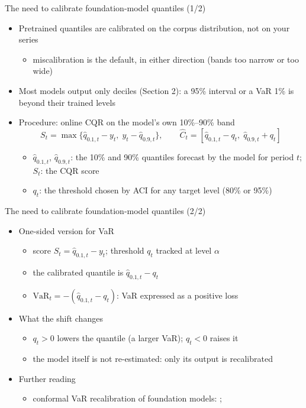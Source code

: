 \begin{frame}{The need to calibrate foundation-model quantiles (1/2)}
\itemsize{\small}
\begin{itemize}
    \item Pretrained quantiles are calibrated on the corpus distribution, not on your series
    \begin{itemize}
        \item miscalibration is the default, in either direction (bands too narrow or too wide)
    \end{itemize}
    \item Most models output only deciles (Section 2): a 95\% interval or a VaR 1\% is beyond their trained levels
    \item Procedure: online CQR on the model's own 10\%--90\% band \[ S_t = \max\{\hat q_{0.1,t} - y_t,\; y_t - \hat q_{0.9,t}\}, \qquad \hat C_t = [\hat q_{0.1,t} - q_t,\; \hat q_{0.9,t} + q_t] \]
    \begin{itemize}
        \item $\hat q_{0.1,t}$, $\hat q_{0.9,t}$: the 10\% and 90\% quantiles forecast by the model for period $t$; $S_t$: the CQR score
        \item $q_t$: the threshold chosen by ACI for any target level (80\% or 95\%)
    \end{itemize}
\end{itemize}
\end{frame}

\begin{frame}{The need to calibrate foundation-model quantiles (2/2)}
\itemsize{\small}
\begin{itemize}
    \item One-sided version for VaR
    \begin{itemize}
        \item score $S_t = \hat q_{0.1,t} - y_t$; threshold $q_t$ tracked at level $\alpha$
        \item the calibrated quantile is $\hat q_{0.1,t} - q_t$
        \item $\mathrm{VaR}_t = -(\hat q_{0.1,t} - q_t)$: VaR expressed as a positive loss
    \end{itemize}
    \item What the shift changes
    \begin{itemize}
        \item $q_t > 0$ lowers the quantile (a larger VaR); $q_t < 0$ raises it
        \item the model itself is not re-estimated: only its output is recalibrated
    \end{itemize}
    \item Further reading
    \begin{itemize}
        \item conformal VaR recalibration of foundation models: ; 
    \end{itemize}
\end{itemize}
\end{frame}

